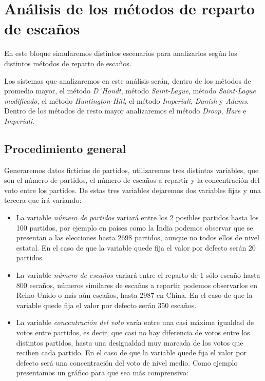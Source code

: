 \documentclass[12pt,a4paper,]{book}
\numberwithin{dummy}{section}
\theoremstyle{ocrenumbox}
\theoremstyle{blacknumex}
\theoremstyle{blacknumbox}
\theoremstyle{ocrenum}
\theoremstyle{ocrenum}
\begin{document}
\hypertarget{anuxe1lisis-de-los-muxe9todos-de-reparto-de-escauxf1os}{%
\chapter{Análisis de los métodos de reparto de
escaños}\label{anuxe1lisis-de-los-muxe9todos-de-reparto-de-escauxf1os}}

En este bloque simularemos distintos escenarios para analizarlos según
los distintos métodos de reparto de escaños.

Los sistemas que analizaremos en este análisis serán, dentro de los
métodos de promedio mayor, el método \emph{D´Hondt}, método
\emph{Saint-Lague}, método \emph{Saint-Lague modificado}, el método
\emph{Huntington-Hill}, el método \emph{Imperiali}, \emph{Danish} y
\emph{Adams}. Dentro de los métodos de resto mayor analizaremos el
método \emph{Droop}, \emph{Hare} e \emph{Imperiali}.

\hypertarget{procedimiento-general}{%
\section{Procedimiento general}\label{procedimiento-general}}

Generaremos datos ficticios de partidos, utilizaremos tres distintas
variables, que son el número de partidos, el número de escaños a
repartir y la concentración del voto entre los partidos. De estas tres
variables dejaremos dos variables fijas y una tercera que irá variando:

\begin{itemize}
\item
  La variable \emph{número de partidos} variará entre los 2 posibles
  partidos hasta los 100 partidos, por ejemplo en países como la India
  podemos observar que se presentan a las elecciones hasta 2698
  partidos, aunque no todos ellos de nivel estatal. En el caso de que la
  variable quede fija el valor por defecto serán 20 partidos.
\item
  La variable \emph{número de escaños} variará entre el reparto de 1
  sólo escaño hasta 800 escaños, números similares de escaños a repartir
  podemos observarlos en Reino Unido o más aún escaños, hasta 2987 en
  China. En el caso de que la variable quede fija el valor por defecto
  serán 350 escaños.
\item
  La variable \emph{concentración del voto} varía entre una casi máxima
  igualdad de votos entre partidos, es decir, que casi no hay diferencia
  de votos entre los distintos partidos, hasta una desigualdad muy
  marcada de los votos que reciben cada partido. En el caso de que la
  variable quede fija el valor por defecto será una concentración del
  voto de nivel medio. Como ejemplo presentamos un gráfico para que sea
  más comprensivo:
\end{itemize}
\end{document}
